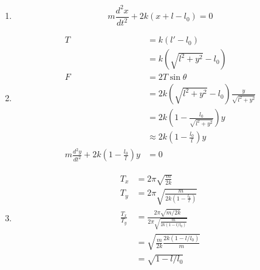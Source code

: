 \documentclass{article}
\begin{document}
\setcounter{subsection}{18}
\subsection{}

\begin{enumerate}
  \item \[m \frac{d^2 x}{d t^2} + 2 k (x + l - l_0) = 0\]

  \item

        \begin{align*}
          T                                                              & = k (l' - l_0)                                            \\
                                                                         & = k (\sqrt{l^2 + y^2} - l_0)                              \\
          F                                                              & = 2 T \sin \theta                                         \\
                                                                         & = 2 k (\sqrt{l^2 + y^2} - l_0) \frac{y}{\sqrt{l^2 + y^2}} \\
                                                                         & = 2 k \left( 1 - \frac{l_0}{\sqrt{l^2 + y^2}} \right) y   \\
                                                                         & \approx 2 k \left( 1 - \frac{l_0}{l} \right) y            \\
          m \frac{d^2 y}{d t^2} + 2 k \left( 1 - \frac{l_0}{l} \right) y & = 0
        \end{align*}

  \item

        \begin{align*}
          T_x             & = 2 \pi \sqrt{\frac{m}{2 k}}                                            \\
          T_y             & = 2 \pi \sqrt{\frac{m}{2 k \left( 1 - \frac{l_0}{l} \right)}}           \\
          \frac{T_x}{T_y} & = \frac{2 \pi \sqrt{m / 2 k}}{2 \pi \sqrt{\frac{m}{2 k (1 - l / l_0)}}} \\
                          & = \sqrt{\frac{m}{2 k} \frac{2 k (1 - l / l_0)}{m}}                      \\
                          & = \sqrt{1 - l / l_0}
        \end{align*}


\end{enumerate}
\end{document}
